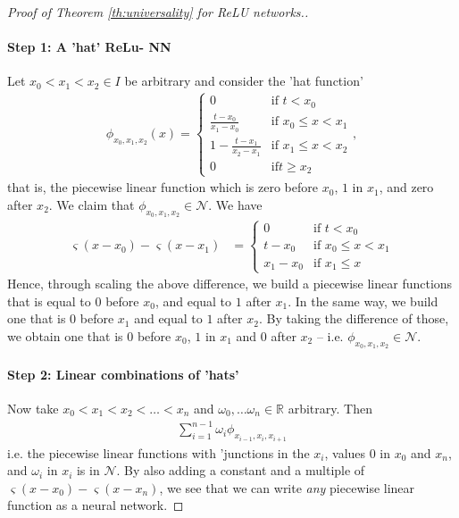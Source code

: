 \documentclass{article}
\newcommand{\calN}{\mathcal{N}}
\newcommand{\R}{\mathbb{R}}
\begin{document}
\begin{proof}[Proof of Theorem \ref{th:universality} for ReLU networks.]
    \paragraph{Step 1: A 'hat' ReLu- NN} Let $x_0<x_1<x_2 \in I$ be arbitrary and consider the 'hat function'
    \begin{align*}
        \phi_{x_0,x_1,x_2}(x) = \begin{cases}
            0 & \text{if } t<x_0 \\
            \tfrac{t-x_0}{x_1-x_0} &\text{if } x_0 \leq x <x_1 \\ 
             1-\tfrac{t-x_1}{x_2-x_1} &\text{if } x_1 \leq x <x_2 \\ 
            0 & \text{if} t\geq x_2
        \end{cases},
    \end{align*}
    that is, the piecewise linear function which is zero before $x_0$, $1$ in $x_1$, and zero after $x_2$. We claim that $\phi_{x_0,x_1,x_2} \in \calN$. We have
    \begin{align*}
        \varsigma(x-x_0) - \varsigma(x-x_1) &= \begin{cases}
            0 & \text{if } t<x_0 \\
            t-x_0 &\text{if } x_0 \leq x <x_1 \\ 
             x_1 - x_0 &\text{if } x_1 \leq x
        \end{cases}
    \end{align*}
    Hence, through scaling the above difference, we build a piecewise linear functions that is equal to $0$ before $x_0$, and equal to $1$ after $x_1$. In the same way, we build one that is $0$ before $x_1$ and equal to $1$ after $x_2$. By taking the difference of those, we obtain one that is $0$ before $x_0$, $1$ in $x_1$ and $0$ after $x_2$ -- i.e. $\phi_{x_0,x_1,x_2} \in \calN$.

     \paragraph{Step 2: Linear combinations of 'hats'} Now take $x_0<x_1<x_2 < \dots < x_n$ and $\omega_0, \dots \omega_n \in \R$ arbitrary. Then
     \begin{align*}
         \sum_{i=1}^{n-1} \omega_i \phi_{x_{i-1},x_{i},x_{i+1}} 
     \end{align*}
     i.e. the piecewise linear functions with 'junctions in the $x_i$, values $0$ in $x_0$ and $x_n$, and $\omega_i$ in $x_i$ is in $\calN$. By also adding a constant and a multiple of $\varsigma(x-x_0) - \varsigma(x-x_n)$, we see that we can write \emph{any} piecewise linear function as a neural network.


\end{proof}
\end{document}
